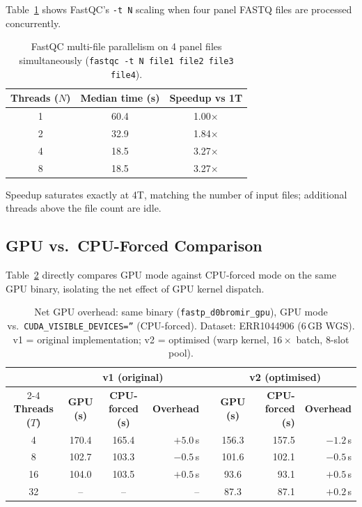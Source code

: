\documentclass[a4paper,12pt]{article}
\begin{document}
Table~\ref{tab:fqcpar} shows FastQC's \texttt{-t~N} scaling when four
panel FASTQ files are processed concurrently.

\begin{table}[H]
  \centering
  \caption{FastQC multi-file parallelism on 4 panel files simultaneously
    (\texttt{fastqc -t N file1 file2 file3 file4}).}
  \label{tab:fqcpar}
  \begin{tabular}{ccc}
    \toprule
    \textbf{Threads ($N$)} & \textbf{Median time (s)} & \textbf{Speedup vs 1T} \\
    \midrule
    1 & 60.4 & 1.00$\times$ \\
    2 & 32.9 & 1.84$\times$ \\
    4 & 18.5 & 3.27$\times$ \\
    8 & 18.5 & 3.27$\times$ \\
    \bottomrule
  \end{tabular}
\end{table}

\noindent Speedup saturates exactly at 4T, matching the number of input files;
additional threads above the file count are idle.

\subsection{GPU vs.\ CPU-Forced Comparison}

Table~\ref{tab:gpuoverhead} directly compares GPU mode against CPU-forced mode
on the same GPU binary, isolating the net effect of GPU kernel dispatch.

\begin{table}[H]
  \centering
  \caption{Net GPU overhead: same binary (\texttt{fastp\_d0bromir\_gpu}),
    GPU mode vs.\ \texttt{CUDA\_VISIBLE\_DEVICES=''} (CPU-forced).
    Dataset: ERR1044906 (6\,GB WGS).  v1 = original implementation;
    v2 = optimised (warp kernel, $16\times$ batch, 8-slot pool).}
  \label{tab:gpuoverhead}
  \begin{tabular}{cccrccrr}
    \toprule
    & \multicolumn{3}{c}{\textbf{v1 (original)}} & & \multicolumn{3}{c}{\textbf{v2 (optimised)}} \\
    \cmidrule{2-4}\cmidrule{6-8}
    \textbf{Threads ($T$)} & \textbf{GPU (s)} & \textbf{CPU-forced (s)} & \textbf{Overhead} & &
    \textbf{GPU (s)} & \textbf{CPU-forced (s)} & \textbf{Overhead} \\
    \midrule
    4  & 170.4 & 165.4 & $+5.0$\,s & & 156.3 & 157.5 & $-1.2$\,s \\
    8  & 102.7 & 103.3 & $-0.5$\,s & & 101.6 & 102.1 & $-0.5$\,s \\
    16 & 104.0 & 103.5 & $+0.5$\,s & &  93.6 &  93.1 & $+0.5$\,s \\
    32 &  --   &  --   & --        & &  87.3 &  87.1 & $+0.2$\,s \\
    \bottomrule
  \end{tabular}
\end{table}
\end{document}
